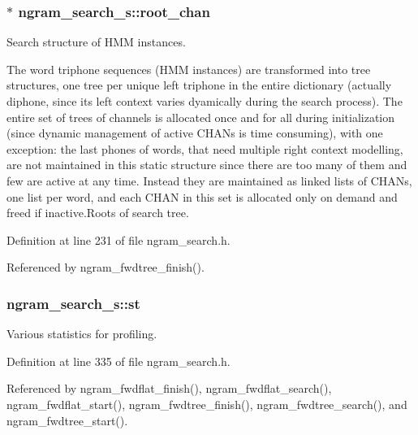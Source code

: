 \subsubsection[{root\+\_\+chan}]{$\ast$ ngram\+\_\+search\+\_\+s\+::root\+\_\+chan}\label{structngram__search__s_ae1b0a51cfcddc1e4b6ac94fa1e48887a}


Search structure of H\+M\+M instances. 

The word triphone sequences (H\+M\+M instances) are transformed into tree structures, one tree per unique left triphone in the entire dictionary (actually diphone, since its left context varies dyamically during the search process). The entire set of trees of channels is allocated once and for all during initialization (since dynamic management of active C\+H\+A\+Ns is time consuming), with one exception\+: the last phones of words, that need multiple right context modelling, are not maintained in this static structure since there are too many of them and few are active at any time. Instead they are maintained as linked lists of C\+H\+A\+Ns, one list per word, and each C\+H\+A\+N in this set is allocated only on demand and freed if inactive.\+Roots of search tree. 

Definition at line 231 of file ngram\+\_\+search.\+h.



Referenced by ngram\+\_\+fwdtree\+\_\+finish().

\subsubsection[{st}]{ ngram\+\_\+search\+\_\+s\+::st}\label{structngram__search__s_a5758d167fbb48e824a6a58186620e06d}


Various statistics for profiling. 



Definition at line 335 of file ngram\+\_\+search.\+h.



Referenced by ngram\+\_\+fwdflat\+\_\+finish(), ngram\+\_\+fwdflat\+\_\+search(), ngram\+\_\+fwdflat\+\_\+start(), ngram\+\_\+fwdtree\+\_\+finish(), ngram\+\_\+fwdtree\+\_\+search(), and ngram\+\_\+fwdtree\+\_\+start().


